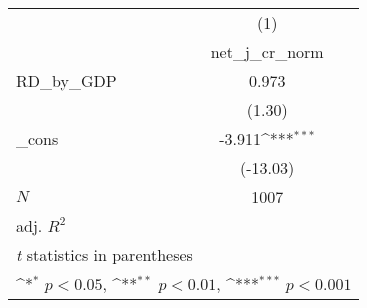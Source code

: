 {
\def\sym#1{\ifmmode^{#1}\else\(^{#1}\)\fi}
\begin{tabular}{l*{1}{c}}
\toprule
            &\multicolumn{1}{c}{(1)}\\
            &\multicolumn{1}{c}{net\_j\_cr\_norm}\\
\midrule
RD\_by\_GDP   &       0.973         \\
            &      (1.30)         \\
\addlinespace
\_cons      &      -3.911\sym{***}\\
            &    (-13.03)         \\
\midrule
\(N\)       &        1007         \\
adj. \(R^{2}\)&                     \\
\bottomrule
\multicolumn{2}{l}{\footnotesize \textit{t} statistics in parentheses}\\
\multicolumn{2}{l}{\footnotesize \sym{*} \(p<0.05\), \sym{**} \(p<0.01\), \sym{***} \(p<0.001\)}\\
\end{tabular}
}

